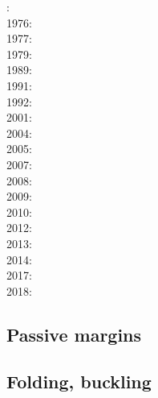 {\scriptsize
{}: \cite{fouy75}\cite{sosr75}\\
1976: \cite{riss76}\\
1977: \cite{chtu77}\\
1979: \cite{riss79}\\
1989: \cite{boww89}\\
1991: \cite{worg91}\\
1992: \cite{rich92}\cite{wuvr92}\cite{zoba92}\cite{clko92}\\
2001: \cite{stsm01}\\
2004: \cite{ligu04}\\
2005: \cite{timr05}\\
2007: \cite{hert07}\\
2008: \cite{bilr08}\cite{ghhw08}\\
2009: \cite{ghhf09}\cite{nacl09}\\
2010: \cite{bepo10}\cite{yosh10}\\
2012: \cite{nalr12}\cite{ghho12}\cite{wagw12}\\
2013: \cite{ghhw13}\cite{wagw13}\\
2014: \cite{vagw14}\\
2017: \cite{grrb17}\\
2018: \cite{osss18}
}

\subsection{Passive margins} 

{\scriptsize
\noindent
\cite{clwv82}
\cite{lies86}
\cite{gebi05}
\cite{clbz08}
\cite{kasb08}
\cite{fasm10}
\cite{nigm10}
\cite{rapy11}
\cite{nigm11}
\cite{brfo11}
\cite{mana13}
\cite{yahb13}
\cite{macg14}
\cite{gebw15}
\cite{nigo15}
\cite{dupm16}
\cite{sahf18}
\cite{mube18}
\cite{tebu18}
\cite{zhli19}
}

\subsection{Folding, buckling} 

